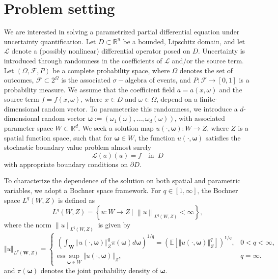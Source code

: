 \section{Problem setting}\label{sec:Problem_setting}
We are interested in solving a parametrized partial differential equation under uncertainty quantification. Let $D\subset \mathbb{R}^n$ be a bounded, Lipschitz domain, and let $\mathcal{L}$ denote a (possibly nonlinear) differential operator posed on $D$. Uncertainty is introduced through randomness in the coefficients of $\mathcal{L}$ and/or the source term. Let $(\Omega, \mathcal{F}, P)$ be a complete probability space, where $\Omega$ denotes the set of outcomes, $\mathcal{F}\subset 2^{\Omega}$ is the associated $\sigma-$algebra of events, and $P:\mathcal{F}\rightarrow [0,1]$ is a probability measure. We assume that the coefficient field $a=a(x, \omega)$ and the source term $f = f(x, \omega)$, where $x\in D$ and $\omega\in \Omega$, depend on a finite-dimensional random vector. To parameterize this randomness, we introduce a $d$-dimensional random vector $\boldsymbol \omega :=(\omega_1(\omega),\ldots,\omega_d(\omega))$, with associated parameter space $W\subset \mathbb{R}^d$. We seek a solution map $u(\cdot, \boldsymbol{\omega}): W \to Z$, where $Z$ is a spatial function space, such that for $\boldsymbol \omega \in W$, the function $u(\cdot, \boldsymbol{\omega})$ satisfies the stochastic boundary value problem almost surely
%
\begin{equation}\label{eq:Problem}
    \mathcal{L}(a)(u) = f \quad \text{in} \;\; D
\end{equation}
%
with appropriate boundary conditions on $\partial D$.

To characterize the dependence of the solution on both spatial and parametric variables, we adopt a Bochner space framework. For $q\in [1,\infty]$, the Bochner space $L^q(W,Z)$ is defined as
%
\[
L^q(W,Z) = \left\{u:W\rightarrow Z\; \bigg\vert \;\left\|u\right\|_{L^q(W,Z)}<\infty\right\},
\]
%
where the norm $\|u\|_{L^q(W,Z)}$ is given by
%
\[
\left\Vert u \right\Vert_{L^q(\boldsymbol W,Z)} =\left\{\begin{array}{lll}
     \left(\int_{\boldsymbol W} \left\Vert u(\cdot,\boldsymbol{\omega})  \right\Vert_{Z}^q \pi(\boldsymbol{\omega})d\boldsymbol{\omega} \right)^{1/q} = \left(\mathbb{E}\left[\left\Vert u(\cdot,\boldsymbol{\omega})  \right\Vert_{Z}^q\right]\right)^{1/q}, & 0<q<\infty, \\
     \text{ess} \sup_{\boldsymbol{\omega}\in W}\left\Vert u(\cdot,\boldsymbol{\omega})  \right\Vert_{Z}, & q=\infty.
\end{array}
\right.
\]
and $\pi(\boldsymbol{\omega})$ denotes the joint probability density of $\boldsymbol{\omega}$.

